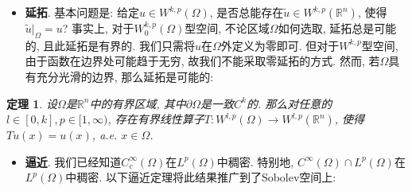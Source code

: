 \documentclass[12pt,a4paper]{article}
\newtheorem{theorem}{定理}[section]
\begin{document}
\begin{itemize}
    \item \textbf{延拓}. 基本问题是: 给定$u \in W^{k, p}(\Omega)$, 是否总能存在$\widetilde{u} \in W^{k, p}(\mathbb{R}^n)$, 使得$\widetilde{u}|_{\Omega} = u$?
    事实上, 对于$W_0^{k, p}(\Omega)$型空间, 不论区域$\Omega$如何选取, 延拓总是可能的, 且此延拓是有界的.
    我们只需将$u$在$\Omega$外定义为零即可. 但对于$W^{k, p}$型空间, 由于函数在边界处可能趋于无穷, 故我们不能采取零延拓的方式.
    然而, 若$\Omega$具有充分光滑的边界, 那么延拓是可能的:
\end{itemize}

\begin{theorem}
    设$\Omega$是$\mathbb{R}^n$中的有界区域, 其中$\partial\Omega$是一致$C^k$的.
    那么对任意的$l \in [0, k], p \in [1, \infty)$, 存在有界线性算子$T\colon W^{l, p}(\Omega) \rightarrow W^{l, p}(\mathbb{R}^n)$, 使得$Tu(x) = u(x)$, a.e. $x \in \Omega$.
\end{theorem}

\begin{itemize}
    \item \textbf{逼近}. 我们已经知道$C_c^{\infty}(\Omega)$在$L^p(\Omega)$中稠密. 特别地, $C^{\infty}(\Omega) \cap L^p(\Omega)$在$L^p(\Omega)$中稠密.
    以下逼近定理将此结果推广到了Sobolev空间上: 
\end{itemize}
\end{document}
